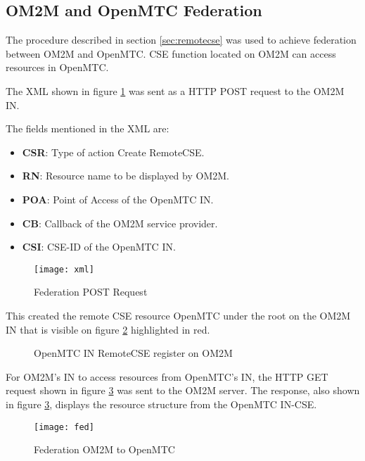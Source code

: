 \subsection{OM2M and OpenMTC Federation}
\label{sec:federation}

The procedure described in section \ref{sec:remotecse} was used to achieve federation between OM2M and OpenMTC. CSE function located on OM2M can access resources in OpenMTC.

The XML shown in figure \ref{fig:federation-post-request} was sent as a HTTP POST request to the OM2M IN.

The fields mentioned in the XML are:

\begin{itemize}
\item \textbf{CSR}: Type of action Create RemoteCSE.
\item \textbf{RN}: Resource name to be displayed by OM2M. 
\item \textbf{POA}: Point of Access of the OpenMTC IN.
\item \textbf{CB}: Callback of the OM2M service provider.
\item \textbf{CSI}: CSE-ID of the OpenMTC IN.
\end{itemize}

\begin{figure}[H]
  \centering
  \texttt{[image: xml]}
  \caption{Federation POST Request}
  \label{fig:federation-post-request}
\end{figure}

This created the remote CSE resource OpenMTC under the root on the OM2M IN that is visible on figure \ref{fig:cseopemtc} highlighted in red.

\begin{figure}[H]
  \centering
  \caption[OpenMTC IN RemoteCSE register on OM2M]{OpenMTC IN RemoteCSE register on OM2M}
  \label{fig:cseopemtc}
\end{figure}

For OM2M's IN to access resources from OpenMTC's IN, the HTTP GET request shown in figure \ref{fig:fed} was sent to the OM2M server. The response, also shown in figure \ref{fig:fed}, displays the resource structure from the OpenMTC IN-CSE.  

\begin{figure}[H]
  \centering
  \texttt{[image: fed]}
  \caption[Federation OM2M to OpenMTC]{Federation OM2M to OpenMTC}
  \label{fig:fed}
\end{figure}

